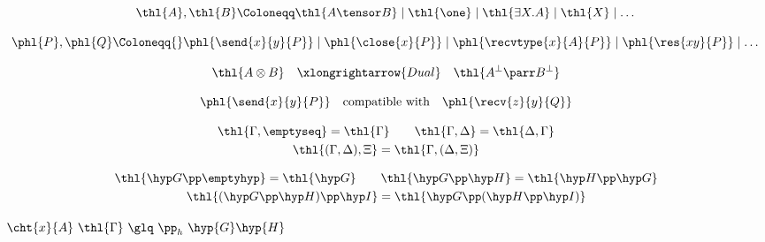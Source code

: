 \begin{highlight}
\[
  \thl{A}, \thl{B} \Coloneqq
    \thl{A \tensor B}
    \mid{} \thl{\one}
    \mid{} \thl{\exists X.A}
    \mid{} \thl{X}
    \mid \dots
\]
\end{highlight}
    
\begin{highlight}
\[
\phl{P}, \phl{Q} \Coloneqq{}
  \phl{\send{x}{y}{P}}
  \mid \phl{\close{x}{P}}
  \mid \phl{\recvtype{x}{A}{P}}
  \mid \phl{\res{xy}{P}}
  \mid \dots
\]
\end{highlight}

\begin{highlight}
\begin{greybox}
\[
\thl{A \otimes B} \quad \xlongrightarrow{Dual} \quad \thl{A^\bot \parr B^\bot}
\]
\end{greybox}
\end{highlight}

\begin{highlight}
\begin{greybox}
\[
\phl{\send{x}{y}{P}} \quad \text{compatible with} \quad \phl{\recv{z}{y}{Q}}
\]
\end{greybox}
\end{highlight}

\begin{greybox}  
\begin{highlight} %
\begin{gather*}  
\thl{\Gamma, \emptyseq} = \thl{\Gamma}
\qquad
\thl{\Gamma, \Delta} = \thl{\Delta, \Gamma}
\\
\thl{(\Gamma, \Delta), \Xi} = \thl{\Gamma, (\Delta , \Xi)}
\end{gather*}
\end{highlight}

\begin{highlight} %
\begin{gather*}
  \thl{\hyp G \pp \emptyhyp} = \thl{\hyp G}
  \qquad
  \thl{\hyp G \pp \hyp H} = \thl{\hyp H \pp \hyp G}
  \\
  \thl{(\hyp G \pp \hyp H) \pp \hyp I} = \thl{\hyp G \pp (\hyp H \pp \hyp I)}
\end{gather*}

$\cht{x}{A} ~ \thl{\Gamma} ~ \glq ~ \pp_h ~ \hyp{G} \hyp{H}$

\end{highlight}
\end{greybox}

